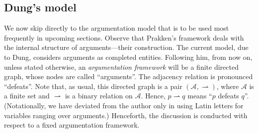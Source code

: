 \documentclass[12pt, a4paper]{article}
\newcommand{\df}{\ensuremath{\rightharpoonup}}
\begin{document}
\subsection{Dung's model}

We now skip directly to the argumentation model that is to be used most frequently in upcoming sections. Observe that Prakken's framework deals with the internal structure of arguments---their construction. The current model, due to Dung, considers arguments as completed entities. Following him, from now on, unless stated otherwise, an \emph{argumentation framework} will be a finite directed graph, whose nodes are called ``arguments''. The adjacency relation is pronounced ``defeats''. Note that, as usual, this directed graph is a pair $(\mathcal{A}, \df)$, where $\mathcal{A}$ is a finite set and $\df$ is a binary relation on $\mathcal{A}$. Hence, $p \df q$ means ``$p$ defeats $q$''. (Notationally, we have deviated from the author only in using Latin letters for variables ranging over arguments.) Henceforth, the discussion is conducted with respect to a fixed argumentation framework.
\end{document}
